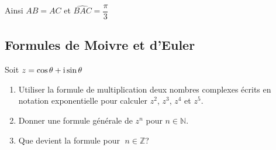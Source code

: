 
 \medskip
 
 Ainsi $ AB=AC $  et $ \widehat{BAC}=\dfrac{\pi}{3} $
\subsection*{ Formules de Moivre et d'Euler}
\begin{lemma}
Soit $ z=\cos \theta +\text{i} \sin \theta $
\begin{enumerate}
\item Utiliser la formule de multiplication deux nombres complexes écrits en notation exponentielle pour calculer $ z^2 $, $ z^3 $, $ z^4 $ et  $ z^5 $.
\item Donner une formule générale de $ z^n $ pour $ n\in\mathbb{N} $.
\item Que devient la  formule   pour $\; n\in\mathbb{Z} $? 
\end{enumerate}
\end{lemma}

